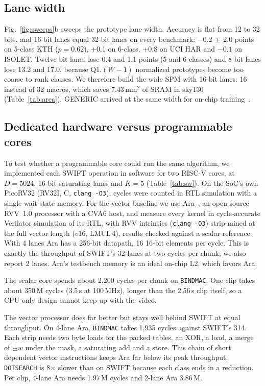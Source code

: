 \documentclass[conference]{IEEEtran}
\begin{document}
\subsection{Lane width}
\label{sec:lane}
Fig.~\ref{fig:sweeps}b sweeps the prototype lane width. Accuracy is flat from 12 to 32 bits, and 16-bit lanes equal 32-bit lanes on every benchmark: $-0.2\,\pm\,2.0$ points on 5-class KTH ($p=0.62$), +0.1 on 6-class, +0.8 on UCI HAR and $-0.1$ on ISOLET. Twelve-bit lanes lose 0.4 and 1.1 points (5 and 6 classes) and 8-bit lanes lose 13.2 and 17.0, because Q1.$(W{-}1)$ normalized prototypes become too coarse to rank classes. We therefore build the wide SPM with 16-bit lanes: 16 instead of 32 macros, which saves 7.43\,mm$^2$ of SRAM in sky130 (Table~\ref{tab:area}). GENERIC arrived at the same width for on-chip training~\cite{generic}.

\subsection{Dedicated hardware versus programmable cores}
\label{sec:sw}
To test whether a programmable core could run the same algorithm, we implemented each SWIFT operation in software for two RISC-V cores, at $D{=}5024$, 16-bit saturating lanes and $K{=}5$ (Table~\ref{tab:sw}). On the SoC's own PicoRV32 (RV32I, C, \texttt{clang -O3}), cycles were counted in RTL simulation with a single-wait-state memory. For the vector baseline we use Ara~\cite{ara}, an open-source RVV~1.0 processor with a CVA6 host, and measure every kernel in cycle-accurate Verilator simulation of its RTL, with RVV intrinsics (\texttt{clang -O3}) strip-mined at the full vector length ($e16$, LMUL\,4), results checked against a scalar reference.
With 4 lanes Ara has a 256-bit datapath, 16 16-bit elements per cycle. This is exactly the throughput of SWIFT's 32 lanes at two cycles per chunk; we also report 2 lanes. Ara's testbench memory is an ideal on-chip L2, which favors Ara.

The scalar core spends about 2,200 cycles per chunk on \texttt{BINDMAC}. One clip takes about 350\,M cycles (3.5\,s at 100\,MHz), longer than the 2.56\,s clip itself, so a CPU-only design cannot keep up with the video.

The vector processor does far better but stays well behind SWIFT at equal throughput. On 4-lane Ara, \texttt{BINDMAC} takes 1,935 cycles against SWIFT's 314. Each strip needs two byte loads for the packed tables, an XOR, a load, a merge of $\pm w$ under the mask, a saturating add and a store. This chain of short dependent vector instructions keeps Ara far below its peak throughput. \texttt{DOTSEARCH} is 8$\times$ slower than on SWIFT because each class ends in a reduction. Per clip, 4-lane Ara needs 1.97\,M cycles and 2-lane Ara 3.86\,M.
\end{document}
